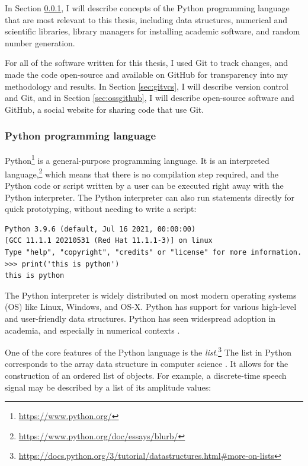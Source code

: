 \documentclass[report.tex]{subfiles}
\begin{document}
In Section \ref{sec:pythonbasics}, I will describe concepts of the Python programming language that are most relevant to this thesis, including data structures, numerical and scientific libraries, library managers for installing academic software, and random number generation.

For all of the software written for this thesis, I used Git to track changes, and made the code open-source and available on GitHub for transparency into my methodology and results. In Section \ref{sec:gitvcs}, I will describe version control and Git, and in Section \ref{sec:ossgithub}, I will describe open-source software and GitHub, a social website for sharing code that use Git.

\subsubsection{Python programming language}
\label{sec:pythonbasics}

Python\footnote{\url{https://www.python.org/}} is a general-purpose programming language. It is an interpreted language,\footnote{\url{https://www.python.org/doc/essays/blurb/}} which means that there is no compilation step required, and the Python code or script written by a user can be executed right away with the Python interpreter. The Python interpreter can also run statements directly for quick prototyping, without needing to write a script:

\begin{listing}[!ht]
\centering
\begin{BVerbatim}
Python 3.9.6 (default, Jul 16 2021, 00:00:00)
[GCC 11.1.1 20210531 (Red Hat 11.1.1-3)] on linux
Type "help", "copyright", "credits" or "license" for more information.
>>> print('this is python')
this is python
\end{BVerbatim}
\end{listing}

The Python interpreter is widely distributed on most modern operating systems (OS) like Linux, Windows, and OS-X. Python has support for various high-level and user-friendly data structures. Python has seen widespread adoption in academia, and especially in numerical contexts \parencite{pythonscience}.

One of the core features of the Python language is the \textit{list}.\footnote{\url{https://docs.python.org/3/tutorial/datastructures.html\#more-on-lists}} The list in Python corresponds to the array data structure in computer science \parencite{skiena}. It allows for the construction of an ordered list of objects. For example, a discrete-time speech signal may be described by a list of its amplitude values:
\end{document}

